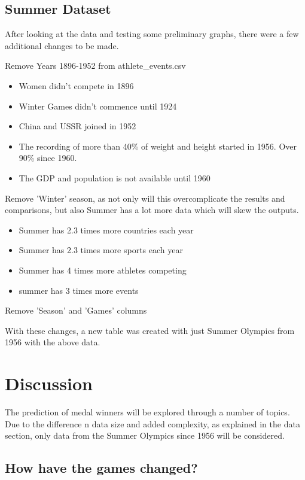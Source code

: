 \documentclass[a4 paper, 12pt]{article}
\begin{document}
    \subsection{Summer Dataset}
    After looking at the data and testing some preliminary graphs, there were a few additional changes to be made.
    \item Remove Years 1896-1952 from athlete\_events.csv
        \begin{itemize}
            \item Women didn't compete in 1896
            \item Winter Games didn't commence until 1924
            \item China and USSR joined in 1952
            \item The recording of more than 40\% of weight and height started in 1956. Over 90\% since 1960.
            \item The GDP and population is not available until 1960
        \end{itemize}
    \item Remove 'Winter' season, as not only will this overcomplicate the results and comparisons, but also Summer has a lot more data which will skew the outputs.
        \begin{itemize}
            \item Summer has 2.3 times more countries each year
            \item Summer has 2.3 times more sports each year
            \item Summer has 4 times more athletes competing
            \item summer has 3 times more events
        \end{itemize}
    \item Remove 'Season' and 'Games' columns
    
    With these changes, a new table was created with just Summer Olympics from 1956 with the above data.       

\section{Discussion}
The prediction of medal winners will be explored through a number of topics. Due to the difference n data size and added complexity, as explained in the data section, only data from the Summer Olympics since 1956 will be considered. 


\subsection{How have the games changed?}
\end{document}
